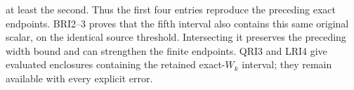 at least the second. Thus the first four entries reproduce
the preceding exact endpoints. BRI2--3 proves that the fifth
interval also contains this same original scalar, on the identical
source threshold. Intersecting it preserves the preceding width
bound and can strengthen the finite endpoints. QRI3 and LRI4
give evaluated enclosures containing the retained exact-$W_k$
interval; they remain available with every explicit error.